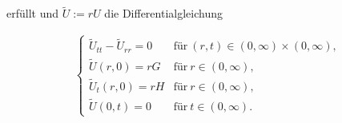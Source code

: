 \begin{exercise}
erfüllt und $\tilde U := r U$ die Differentialgleichung

\begin{align*}
    \begin{cases}
        \tilde U_{tt} - \tilde U_{rr} = 0 & \text{für}~ (r, t) \in (0, \infty) \times (0, \infty), \\
        \tilde U(r, 0) = r G              & \text{für}~ r \in (0, \infty), \\
        \tilde U_t(r, 0) = r H            & \text{für}~ r \in (0, \infty), \\
        \tilde U(0, t) = 0                & \text{für}~ t \in (0, \infty).            
    \end{cases}
\end{align*}

\end{exercise}


